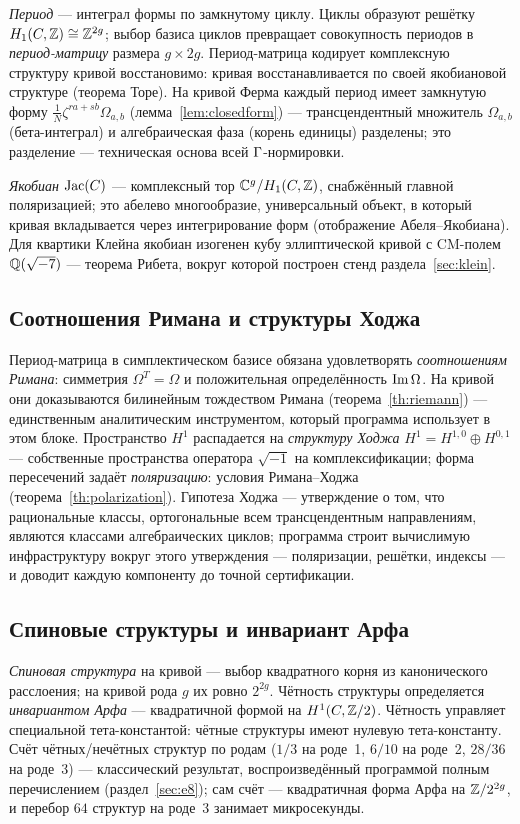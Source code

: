 \emph{Период} --- интеграл формы по замкнутому циклу. Циклы
образуют решётку $H_1(C,\mathbb{Z})\cong\mathbb{Z}^{2g}$; выбор базиса циклов
превращает совокупность периодов в \emph{период-матрицу} размера
$g\times2g$. Период-матрица кодирует комплексную структуру кривой
восстановимо: кривая восстанавливается по своей якобиановой
структуре (теорема Торе). На кривой Ферма каждый период имеет
замкнутую форму $\frac1N\zeta^{ra+sb}\Omega_{a,b}$
(лемма~\ref{lem:closedform}) --- трансцендентный множитель
$\Omega_{a,b}$ (бета-интеграл) и алгебраическая фаза (корень
единицы) разделены; это разделение --- техническая основа всей
$\Gamma$-нормировки.

\emph{Якобиан} $\operatorname{Jac}(C)$ --- комплексный тор $\mathbb{C}^g/H_1(C,\mathbb{Z})$,
снабжённый главной поляризацией; это абелево многообразие,
универсальный объект, в который кривая вкладывается через
интегрирование форм (отображение Абеля--Якобиана). Для квартики
Клейна якобиан изогенен кубу эллиптической кривой с CM-полем
$\mathbb{Q}(\sqrt{-7})$ --- теорема Рибета, вокруг которой построен
стенд раздела~\ref{sec:klein}.

\subsection{Соотношения Римана и структуры Ходжа}

Период-матрица в симплектическом базисе обязана удовлетворять
\emph{соотношениям Римана}: симметрия $\Omega^T=\Omega$ и
положительная определённость $\operatorname{Im}\Omega$. На кривой они доказываются
билинейным тождеством Римана (теорема~\ref{th:riemann}) ---
единственным аналитическим инструментом, который программа
использует в этом блоке. Пространство $H^1$ распадается на
\emph{структуру Ходжа} $H^1=H^{1,0}\oplus H^{0,1}$ --- собственные
пространства оператора $\sqrt{-1}$ на комплексификации; форма
пересечений задаёт \emph{поляризацию}: условия Римана--Ходжа
(теорема~\ref{th:polarization}). Гипотеза Ходжа --- утверждение о
том, что рациональные классы, ортогональные всем трансцендентным
направлениям, являются классами алгебраических циклов; программа
строит вычислимую инфраструктуру вокруг этого утверждения ---
поляризации, решётки, индексы --- и доводит каждую компоненту до
точной сертификации.

\subsection{Спиновые структуры и инвариант Арфа}

\emph{Спиновая структура} на кривой --- выбор квадратного корня из
канонического расслоения; на кривой рода $g$ их ровно $2^{2g}$.
Чётность структуры определяется \emph{инвариантом Арфа} ---
квадратичной формой на $H^1(C,\mathbb{Z}/2)$. Чётность управляет
специальной тета-константой: чётные структуры имеют нулевую
тета-константу. Счёт чётных/нечётных структур по родам ($1/3$ на
роде~1, $6/10$ на роде~2, $28/36$ на роде~3) --- классический
результат, воспроизведённый программой полным перечислением
(раздел~\ref{sec:e8}); сам счёт --- квадратичная форма Арфа на
$\mathbb{Z}/2^{2g}$, и перебор $64$ структур на роде~3 занимает
микросекунды.

